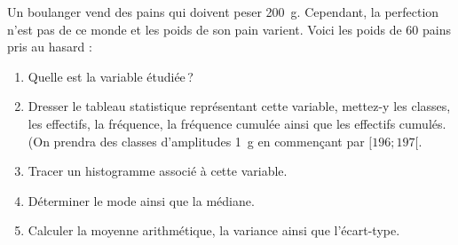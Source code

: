       \begin{exo}
            Un boulanger vend des pains qui doivent peser 200~g.
            Cependant, la perfection n'est pas de ce monde et les poids de son pain varient.
            Voici les poids de 60 pains pris au hasard :
            \begin{center}
            \end{center}
            \begin{enumerate}
	                  \item Quelle est la variable \'etudi\'ee\,?
                  \item Dresser le tableau statistique repr\'esentant cette variable,
                        mettez-y les classes, les effectifs, la fr\'equence, la fr\'equence cumul\'ee ainsi que les effectifs cumul\'es.
                        (On prendra des classes d'amplitudes 1~g en commen\c{c}ant par $[196 ; 197[$.
                  \item Tracer un histogramme associ\'e \`a cette variable.
                  \item D\'eterminer le mode ainsi que la m\'ediane.
                  \item Calculer la moyenne arithm\'etique, la variance ainsi que l'\'ecart-type.
            \end{enumerate}
      \end{exo}
